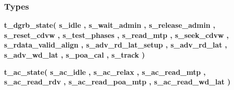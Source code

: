 \subsubsection*{Types}
 \begin{DoxyCompactItemize}
\item 
{\bfseries {\bf t\+\_\+dgrb\+\_\+state}{\bfseries \textcolor{vhdlchar}{(}\textcolor{vhdlchar}{ }\textcolor{vhdlchar}{s\+\_\+idle}\textcolor{vhdlchar}{ }\textcolor{vhdlchar}{,}\textcolor{vhdlchar}{ }\textcolor{vhdlchar}{s\+\_\+wait\+\_\+admin}\textcolor{vhdlchar}{ }\textcolor{vhdlchar}{,}\textcolor{vhdlchar}{ }\textcolor{vhdlchar}{s\+\_\+release\+\_\+admin}\textcolor{vhdlchar}{ }\textcolor{vhdlchar}{,}\textcolor{vhdlchar}{ }\textcolor{vhdlchar}{s\+\_\+reset\+\_\+cdvw}\textcolor{vhdlchar}{ }\textcolor{vhdlchar}{,}\textcolor{vhdlchar}{ }\textcolor{vhdlchar}{s\+\_\+test\+\_\+phases}\textcolor{vhdlchar}{ }\textcolor{vhdlchar}{,}\textcolor{vhdlchar}{ }\textcolor{vhdlchar}{s\+\_\+read\+\_\+mtp}\textcolor{vhdlchar}{ }\textcolor{vhdlchar}{,}\textcolor{vhdlchar}{ }\textcolor{vhdlchar}{s\+\_\+seek\+\_\+cdvw}\textcolor{vhdlchar}{ }\textcolor{vhdlchar}{,}\textcolor{vhdlchar}{ }\textcolor{vhdlchar}{s\+\_\+rdata\+\_\+valid\+\_\+align}\textcolor{vhdlchar}{ }\textcolor{vhdlchar}{,}\textcolor{vhdlchar}{ }\textcolor{vhdlchar}{s\+\_\+adv\+\_\+rd\+\_\+lat\+\_\+setup}\textcolor{vhdlchar}{ }\textcolor{vhdlchar}{,}\textcolor{vhdlchar}{ }\textcolor{vhdlchar}{s\+\_\+adv\+\_\+rd\+\_\+lat}\textcolor{vhdlchar}{ }\textcolor{vhdlchar}{,}\textcolor{vhdlchar}{ }\textcolor{vhdlchar}{s\+\_\+adv\+\_\+wd\+\_\+lat}\textcolor{vhdlchar}{ }\textcolor{vhdlchar}{,}\textcolor{vhdlchar}{ }\textcolor{vhdlchar}{s\+\_\+poa\+\_\+cal}\textcolor{vhdlchar}{ }\textcolor{vhdlchar}{,}\textcolor{vhdlchar}{ }\textcolor{vhdlchar}{s\+\_\+track}\textcolor{vhdlchar}{ }\textcolor{vhdlchar}{)}\textcolor{vhdlchar}{ }}} 
\item 
{\bfseries {\bf t\+\_\+ac\+\_\+state}{\bfseries \textcolor{vhdlchar}{(}\textcolor{vhdlchar}{ }\textcolor{vhdlchar}{s\+\_\+ac\+\_\+idle}\textcolor{vhdlchar}{ }\textcolor{vhdlchar}{,}\textcolor{vhdlchar}{ }\textcolor{vhdlchar}{s\+\_\+ac\+\_\+relax}\textcolor{vhdlchar}{ }\textcolor{vhdlchar}{,}\textcolor{vhdlchar}{ }\textcolor{vhdlchar}{s\+\_\+ac\+\_\+read\+\_\+mtp}\textcolor{vhdlchar}{ }\textcolor{vhdlchar}{,}\textcolor{vhdlchar}{ }\textcolor{vhdlchar}{s\+\_\+ac\+\_\+read\+\_\+rdv}\textcolor{vhdlchar}{ }\textcolor{vhdlchar}{,}\textcolor{vhdlchar}{ }\textcolor{vhdlchar}{s\+\_\+ac\+\_\+read\+\_\+poa\+\_\+mtp}\textcolor{vhdlchar}{ }\textcolor{vhdlchar}{,}\textcolor{vhdlchar}{ }\textcolor{vhdlchar}{s\+\_\+ac\+\_\+read\+\_\+wd\+\_\+lat}\textcolor{vhdlchar}{ }\textcolor{vhdlchar}{)}\textcolor{vhdlchar}{ }}} 

\end{DoxyCompactItemize}
